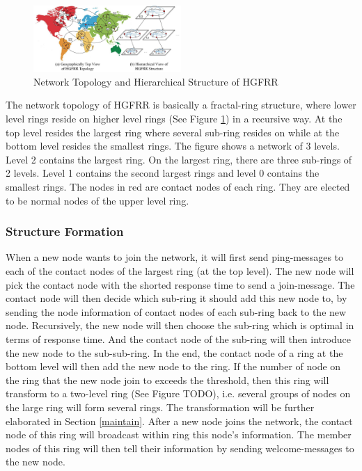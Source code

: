 \begin{figure}[t]
	\includegraphics[width=0.5\textwidth]{figures/topo.jpg}
	\caption{Network Topology and Hierarchical Structure of HGFRR}
	\label{fig:topo}
\end{figure}

The network topology of HGFRR is basically a fractal-ring structure, where lower level rings reside on higher level rings (See Figure \ref{fig:topo}) in a recursive way. At the top level resides the largest ring where several sub-ring resides on while at the bottom level resides the smallest rings. The figure shows a network of 3 levels. Level 2 contains the largest ring. On the largest ring, there are three sub-rings of 2 levels. Level 1 contains the second largest rings and level 0 contains the smallest rings. The nodes in red are contact nodes of each ring. They are elected to be normal nodes of the upper level ring.

\subsubsection{Structure Formation} \label{formation}

When a new node wants to join the network, it will first send ping-messages to each of the contact nodes of the largest ring (at the top level). The new node will pick the contact node with the shorted response time to send a join-message. The contact node will then decide which sub-ring it should add this new node to, by sending the node information of contact nodes of each sub-ring back to the new node. Recursively, the new node will then choose the sub-ring which is optimal in terms of response time. And the contact node of the sub-ring will then introduce the new node to the sub-sub-ring. In the end, the contact node of a ring at the bottom level will then add the new node to the ring. If the number of node on the ring that the new node join to exceeds the threshold, then this ring will transform to a two-level ring (See Figure TODO), i.e. several groups of nodes on the large ring will form several rings. The transformation will be further elaborated in Section \cref{maintain}. After a new node joins the network, the contact node of this ring will broadcast within ring this node's information. The member nodes of this ring will then tell their information by sending welcome-messages to the new node.

